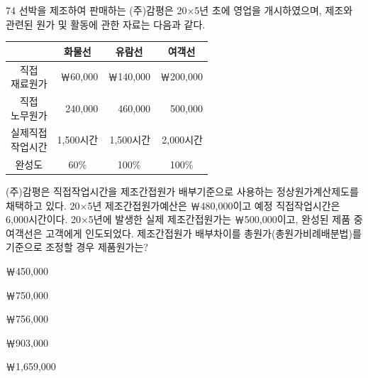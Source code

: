 \begin{question}{74}
선박을 제조하여 판매하는 (주)감평은 20×5년 초에 영업을 개시하였으며, 제조와 관련된 원가 및 활동에 관한 자료는 다음과 같다.

{\small\centering\begin{tabular}{|c|r|r|r|}\hline
 & \multicolumn{1}{c|}{화물선} & \multicolumn{1}{c|}{유람선} & \multicolumn{1}{c|}{여객선} \\ \hline
\makecell{직접\\재료원가} & ￦60,000 & ￦140,000 & ￦200,000 \\ \hline
\makecell{직접\\노무원가} & 240,000 & 460,000 & 500,000 \\ \hline
\makecell{실제직접\\작업시간} & 1,500시간 & 1,500시간 & 2,000시간 \\ \hline
완성도 & \multicolumn{1}{c|}{60\%} & \multicolumn{1}{c|}{100\%} & \multicolumn{1}{c|}{100\%} \\ \hline
\end{tabular}\par}
\medskip
(주)감평은 직접작업시간을 제조간접원가 배부기준으로 사용하는 정상원가계산제도를 채택하고 있다. 20×5년 제조간접원가예산은 ￦480,000이고 예정 직접작업시간은 6,000시간이다. 20×5년에 발생한 실제 제조간접원가는 ￦500,000이고, 완성된 제품 중 여객선은 고객에게 인도되었다. 제조간접원가 배부차이를 총원가(총원가비례배분법)를 기준으로 조정할 경우 제품원가는?
\begin{choices}
  \item ￦450,000
  \item ￦750,000
  \item ￦756,000
  \item ￦903,000
  \item ￦1,659,000
\end{choices}
\end{question}
